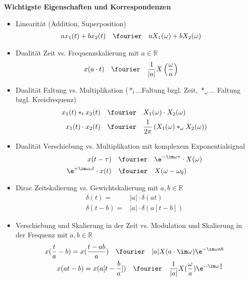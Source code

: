 \noindent \textbf{Wichtigste Eigenschaften und Korrespondenzen}
\begin{itemize}
\item Linearität (Addition, Superposition)
\begin{align}
a x_1(t) + b x_2(t) &\quad \fourier \quad a X_1(\omega) + b X_2(\omega)
\end{align}

\item Dualität Zeit vs. Frequenzskalierung mit $a\in\mathbb{R}$
\begin{align}
x(a \cdot t) &\quad \fourier \quad \frac{1}{|a|}X\left(\frac{\omega}{a}\right)
\end{align}

\item Dualität Faltung vs. Multiplikation ($\ast_t$...Faltung bzgl. Zeit, $\ast_\omega$... Faltung bzgl. Kreisfrequenz)
\begin{align}
x_1(t) \ast_t x_2(t) &\quad \fourier \quad X_1(\omega) \cdot X_2(\omega)\\
x_1(t) \cdot x_2(t) &\quad \fourier \quad \frac{1}{2\pi} \left(X_1(\omega) \ast_\omega X_2(\omega)\right)
\end{align}

\item Dualität Verschiebung vs. Multiplikation mit komplexem Exponentialsignal
\begin{align}
x(t-\tau) &\quad \fourier \quad \e^{-\im\omega\tau} \cdot X(\omega)\\
\e^{+\im\omega_0 t} \cdot x(t) &\quad \fourier \quad X(\omega-\omega_0)
\end{align}

\item Dirac Zeitskalierung vs. Gewichtskalierung
mit $a,b\in\mathbb{R}$
\begin{align}
\delta(t) =& |a| \cdot \delta(a t)\\
\delta(t-b) = & |a| \cdot \delta(a [t-b])
\end{align}

\item Verschiebung und Skalierung in der Zeit vs. Modulation und Skalierung in der Frequenz
mit $a,b\in\mathbb{R}$
\begin{align}
x(\frac{t}{a}-b)  = x(\frac{t-a b}{a}) \quad\fourier\quad
|a| X(a \cdot \im\omega) \e^{-\im\omega a b}\\
x(a t - b)  = x(a [t-\frac{b}{a}]) \quad\fourier\quad
\frac{1}{|a|} X(\frac{\omega}{a}) \e^{-\im\omega \frac{b}{a}}
\end{align}


\end{itemize}
